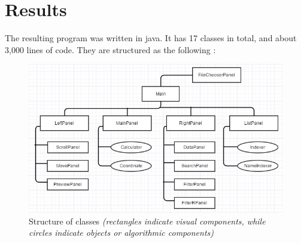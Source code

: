 \documentclass[]{article}
\begin{document}
\section{Results}
The resulting program was written in java. It has 17 classes in total, and about 3,000 lines of code. They are structured as the following : 
\begin{figure}[h!]
	\centering
	\includegraphics[scale=0.7]{diagram}
	\caption{Structure of classes \textit{(rectangles indicate visual components, while circles indicate objects or algorithmic components)}}
\end{figure}

\singlespacing
\end{document}
